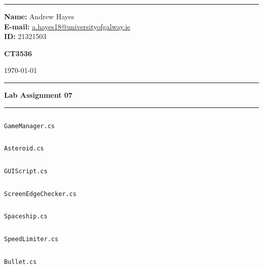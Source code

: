 \documentclass[a4paper, 11pt]{article}
\newenvironment{code}{\captionsetup{type=listing, skip=0pt}}{}
\begin{document}
\hrule \medskip
\begin{minipage}{0.295\textwidth} 
    \raggedright
    \footnotesize 
    \textbf{Name:} Andrew Hayes \\
    \textbf{E-mail:} \href{mailto://a.hayes18@universityofgalway.ie}{a.hayes18@universityofgalway.ie}  \hfill\\   
    \textbf{ID:} 21321503 \hfill
\end{minipage}
\begin{minipage}{0.4\textwidth} 
    \centering 
    \vspace{0.4em}
    \Large 
    \textbf{CT3536} \\ 
\end{minipage}
\begin{minipage}{0.295\textwidth} 
    \raggedleft
    \today
\end{minipage}
\medskip\hrule 
\begin{center}
    \normalsize
    \textbf{Lab Assignment 07}
\end{center}
\hrule

\begin{code}
    \inputminted[texcl, mathescape, breaklines, frame=single, linenos]{csharp}{/home/andrew/code/Unity/Asteroids/Assets/GameManager.cs}
\caption{\texttt{GameManager.cs}}
\end{code}

\begin{code}
\inputminted[texcl, mathescape, breaklines, frame=single, linenos]{csharp}{/home/andrew/code/Unity/Asteroids/Assets/Resources/Asteroid.cs}
\caption{\texttt{Asteroid.cs}}
\end{code}

\begin{code}
\inputminted[texcl, mathescape, breaklines, frame=single, linenos]{csharp}{/home/andrew/code/Unity/Asteroids/Assets/GUIScript.cs}
\caption{\texttt{GUIScript.cs}}
\end{code}

\begin{code}
\inputminted[texcl, mathescape, breaklines, frame=single, linenos]{csharp}{/home/andrew/code/Unity/Asteroids/Assets/ScreenEdgeChecker.cs}
\caption{\texttt{ScreenEdgeChecker.cs}}
\end{code}

\begin{code}
\inputminted[texcl, mathescape, breaklines, frame=single, linenos]{csharp}{/home/andrew/code/Unity/Asteroids/Assets/Spaceship.cs}
\caption{\texttt{Spaceship.cs}}
\end{code}

\begin{code}
\inputminted[texcl, mathescape, breaklines, frame=single, linenos]{csharp}{/home/andrew/code/Unity/Asteroids/Assets/SpeedLimiter.cs}
\caption{\texttt{SpeedLimiter.cs}}
\end{code}


\begin{code}
\inputminted[texcl, mathescape, breaklines, frame=single, linenos]{csharp}{/home/andrew/code/Unity/Asteroids/Assets/Resources/Bullet.cs}
\caption{\texttt{Bullet.cs}}
\end{code}
\end{document}
